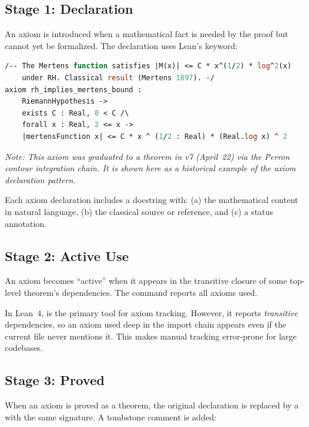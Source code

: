 \documentclass[11pt,a4paper]{article}
\begin{document}
\subsection{Stage 1: Declaration}

An axiom is introduced when a mathematical fact is needed by the
proof but cannot yet be formalized. The declaration uses Lean's
 keyword:

\begin{lstlisting}[language=ML,caption={Axiom declaration example}]
/-- The Mertens function satisfies |M(x)| <= C * x^(1/2) * log^2(x)
    under RH. Classical result (Mertens 1897). -/
axiom rh_implies_mertens_bound :
    RiemannHypothesis ->
    exists C : Real, 0 < C /\
    forall x : Real, 2 <= x ->
    |mertensFunction x| <= C * x ^ (1/2 : Real) * (Real.log x) ^ 2
\end{lstlisting}

\noindent\emph{Note: This axiom was graduated to a theorem in v7 (April~22)
via the Perron contour integration chain. It is shown here as a
historical example of the axiom declaration pattern.}

Each axiom declaration includes a docstring with:
(a) the mathematical content in natural language,
(b) the classical source or reference, and
(c) a status annotation.

\subsection{Stage 2: Active Use}

An axiom becomes ``active'' when it appears in the transitive closure
of some top-level theorem's dependencies. The command
 reports all axioms used.

\begin{observation}
In Lean~4,  is the primary tool for axiom
tracking. However, it reports \emph{transitive} dependencies, so an
axiom used deep in the import chain appears even if the current file
never mentions it. This makes manual tracking error-prone for large
codebases.
\end{observation}

\subsection{Stage 3: Proved}

When an axiom is proved as a theorem, the original 
declaration is replaced by a  with the same signature.
A tombstone comment is added:
\end{document}
